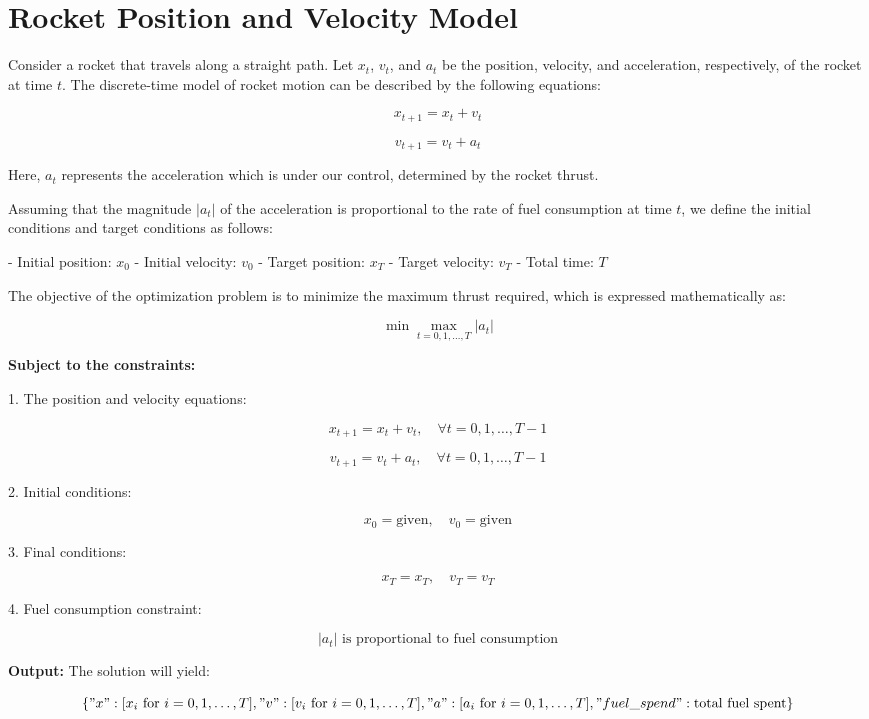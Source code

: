 \documentclass{article}
\begin{document}
\section*{Rocket Position and Velocity Model}

Consider a rocket that travels along a straight path. Let \( x_t \), \( v_t \), and \( a_t \) be the position, velocity, and acceleration, respectively, of the rocket at time \( t \). The discrete-time model of rocket motion can be described by the following equations:

\[
x_{t+1} = x_t + v_t
\]

\[
v_{t+1} = v_t + a_t
\]

Here, \( a_t \) represents the acceleration which is under our control, determined by the rocket thrust.

Assuming that the magnitude \( |a_t| \) of the acceleration is proportional to the rate of fuel consumption at time \( t \), we define the initial conditions and target conditions as follows:

- Initial position: \( x_0 \)
- Initial velocity: \( v_0 \)
- Target position: \( x_T \)
- Target velocity: \( v_T \)
- Total time: \( T \)

The objective of the optimization problem is to minimize the maximum thrust required, which is expressed mathematically as:

\[
\min \max_{t=0,1,\ldots,T} |a_t|
\]

\textbf{Subject to the constraints:}

1. The position and velocity equations:

\[
x_{t+1} = x_t + v_t, \quad \forall t = 0, 1, \ldots, T-1
\]

\[
v_{t+1} = v_t + a_t, \quad \forall t = 0, 1, \ldots, T-1
\]

2. Initial conditions:

\[
x_0 = \text{given}, \quad v_0 = \text{given}
\]

3. Final conditions:

\[
x_T = x_T, \quad v_T = v_T
\]

4. Fuel consumption constraint:

\[
|a_t| \text{ is proportional to fuel consumption}
\]

\textbf{Output:} The solution will yield:

\[
\{
    "x": [x_i \text{ for } i = 0, 1, \ldots, T],
    "v": [v_i \text{ for } i = 0, 1, \ldots, T],
    "a": [a_i \text{ for } i = 0, 1, \ldots, T],
    "fuel\_spend": \text{total fuel spent}
\}
\]
\end{document}

